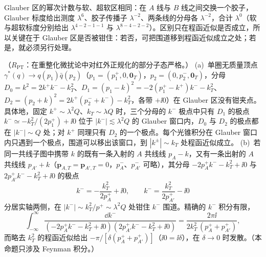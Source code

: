 Glauber 区的幂次计数与软、超软区相同：在 $A$ 线与 $B$ 线之间交换一个胶子，Glauber 标度给出测度 $\lambda^6$、胶子传播子 $\lambda^{-2}$、两条线的分母各 $\lambda^{-2}$，合计 $\lambda^0$（软与超软标度分别给出 $\lambda^{4-2-1-1}$ 与 $\lambda^{8-4-2-2}$）。区别只在程函近似是否成立，所以关键在于 Glauber 区是否被钳住：若否，可把围道移到程函近似成立之处；若是，就必须另行处理。

\begin{proposition}\label{prop:ir-glauber-trapping}
（$R_{\mathrm{PT}}$：在重整化微扰论中对红外正规化的部分子态严格。）
(a)~单圈无质量顶点 $\gamma^*(q)\to q(p_1)\bar q(p_2)$（$p_1=(p_1^+,0,\mathbf 0_T)$，$p_2=(0,p_2^-,\mathbf 0_T)$，分母 $D_0=k^2=2k^+k^--k_T^2$、$D_1=(p_1-k)^2=-2(p_1^+-k^+)k^--k_T^2$、$D_2=(p_2+k)^2=2k^+(p_2^-+k^-)-k_T^2$，各带 $+\ii0$）在 Glauber 区没有钳夹点。具体地，固定 $k^+\sim\lambda^2Q$、$k_T\sim\lambda Q$ 时，三个分母的 $k^-$ 极点中只有 $D_1$ 的极点 $k^-\simeq-k_T^2/(2p_1^+)+\ii0$ 位于 $|k^-|\lesssim\lambda^2Q$ 的 Glauber 窗口内，$D_0$ 与 $D_2$ 的极点都在 $|k^-|\sim Q$ 处；对 $k^+$ 同理只有 $D_2$ 的一个极点。每个光锥积分在 Glauber 窗口内只遇到一个极点，围道可以移出该窗口，到 $|k^\pm|\sim k_T$ 处程函近似成立。
(b)~若同一共线子图中携带 $k$ 的既有一条入射的 $A$ 共线线 $p_A-k$，又有一条出射的 $A$ 共线线 $p_{A'}+k$（$\mathbf p_{A,T}=\mathbf p_{A',T}=0$，$p_A^-$、$p_{A'}^-$ 可略），其分母 $-2p_A^+k^--k_T^2+\ii0$ 与 $2p_{A'}^+k^--k_T^2+\ii0$ 的极点
\begin{equation}\label{eq:ir-glauber-poles}
k^-=-\frac{k_T^2}{2p_A^+}+\ii0,\qquad k^-=\frac{k_T^2}{2p_{A'}^+}-\ii0
\end{equation}
分居实轴两侧，在 $|k^-|\sim k_T^2/p^+\sim\lambda^2Q$ 处钳住 $k^-$ 围道。精确的 $k^-$ 积分有限，
\begin{equation}\label{eq:ir-glauber-exact}
\int_{-\infty}^{\infty}\frac{\dd k^-}{(-2p_A^+k^--k_T^2+\ii0)(2p_{A'}^+k^--k_T^2+\ii0)}=\frac{2\pi\ii}{2k_T^2\,(p_A^++p_{A'}^+)} ,
\end{equation}
而略去 $k_T^2$ 的程函近似给出 $-\pi/[\delta(p_A^++p_{A'}^+)]$（$\ii0=\ii\delta$），在 $\delta\to0$ 时发散。（本命题只涉及 Feynman 积分。）
\end{proposition}
